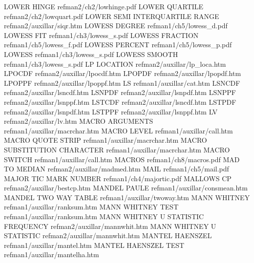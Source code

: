 LOWER HINGE                             refman2/ch2/lowhinge.pdf
LOWER QUARTILE                          refman2/ch2/lowquart.pdf
LOWER SEMI INTERQUARTILE RANGE          refman2/auxillar/siqr.htm
LOWESS DEGREE                           refman1/ch5/lowess_d.pdf
LOWESS FIT                              refman1/ch3/lowess_s.pdf
LOWESS FRACTION                         refman1/ch5/lowess_f.pdf
LOWESS PERCENT                          refman1/ch5/lowess_p.pdf
LOWESS                                  refman1/ch3/lowess_s.pdf
LOWESS SMOOTH                           refman1/ch3/lowess_s.pdf
LP LOCATION                             refman2/auxillar/lp_loca.htm
LPOCDF                                  refman2/auxillar/lpocdf.htm
LPOPDF                                  refman2/auxillar/lpopdf.htm
LPOPPF                                  refman2/auxillar/lpoppf.htm
LS                                      refman1/auxillar/cat.htm
LSNCDF                                  refman2/auxillar/lsncdf.htm
LSNPDF                                  refman2/auxillar/lsnpdf.htm
LSNPPF                                  refman2/auxillar/lsnppf.htm
LSTCDF                                  refman2/auxillar/lsncdf.htm
LSTPDF                                  refman2/auxillar/lsnpdf.htm
LSTPPF                                  refman2/auxillar/lsnppf.htm
LV                                      refman2/auxillar/lv.htm
MACRO ARGUMENTS                         refman1/auxillar/macrchar.htm
MACRO LEVEL                             refman1/auxillar/call.htm
MACRO QUOTE STRIP                       refman1/auxillar/macrchar.htm
MACRO SUBSTITUTION CHARACTER            refman1/auxillar/macrchar.htm
MACRO SWITCH                            refman1/auxillar/call.htm
MACROS                                  refman1/ch8/macros.pdf
MAD TO MEDIAN                           refman2/auxillar/madmed.htm
MAIL                                    refman1/ch5/mail.pdf
MAJOR TIC MARK NUMBER                   refman1/ch4/majortic.pdf
MALLOWS CP                              refman2/auxillar/bestcp.htm
MANDEL PAULE                            refman1/auxillar/consmean.htm
MANDEL TWO WAY TABLE                    refman1/auxillar/twoway.htm
MANN WHITNEY                            refman1/auxillar/ranksum.htm
MANN WHITNEY TEST                       refman1/auxillar/ranksum.htm
MANN WHITNEY U STATISTIC FREQUENCY      refman2/auxillar/mannwhit.htm
MANN WHITNEY U STATISTIC                refman2/auxillar/mannwhit.htm
MANTEL HAENSZEL                         refman1/auxillar/mantel.htm
MANTEL HAENSZEL TEST                    refman1/auxillar/mantelha.htm
